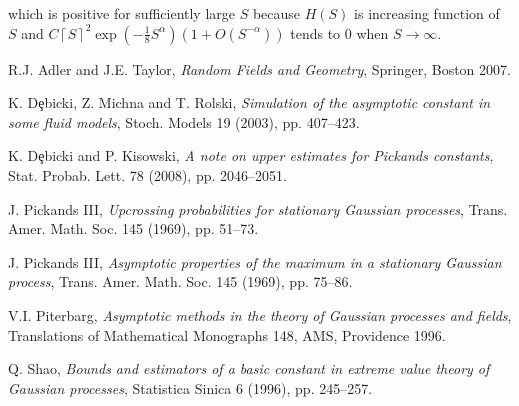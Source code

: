 which is positive for sufficiently large $S$ because $H(S)$ is increasing function of $S$ and
$C\left\lceil S\right\rceil^2\exp(-\frac{1}{8}S^\alpha)(1+O(S^{-\alpha}))$ tends to 0 when $S\rightarrow\infty$.
\halmos





















\begin{thebibliography}{}

R.J. Adler and J.E. Taylor,
{\it Random Fields and Geometry}, Springer, Boston 2007.

K. D{\c e}bicki, Z. Michna and T. Rolski,
{\it Simulation of the asymptotic constant in some fluid models},
Stoch. Models 19 (2003), pp. 407--423.

K. D{\c e}bicki and P. Kisowski, {\it A note on upper estimates for Pickands constants},
Stat. Probab. Lett. 78 (2008), pp. 2046--2051.


J. Pickands III,
{\it Upcrossing probabilities for stationary Gaussian processes},
Trans. Amer. Math. Soc. 145 (1969), pp. 51--73.

J. Pickands III, 
{\it Asymptotic properties of the maximum in a stationary Gaussian process},
Trans. Amer. Math. Soc. 145 (1969), pp. 75--86.

V.I. Piterbarg, 
{\it Asymptotic methods in the theory of Gaussian processes and fields}, Translations of Mathematical Monographs 148,
AMS, Providence 1996.

Q. Shao, 
{\it Bounds and estimators of a basic constant
in extreme value theory of Gaussian processes},
Statistica Sinica 6 (1996), pp. 245--257.

\end{thebibliography}



